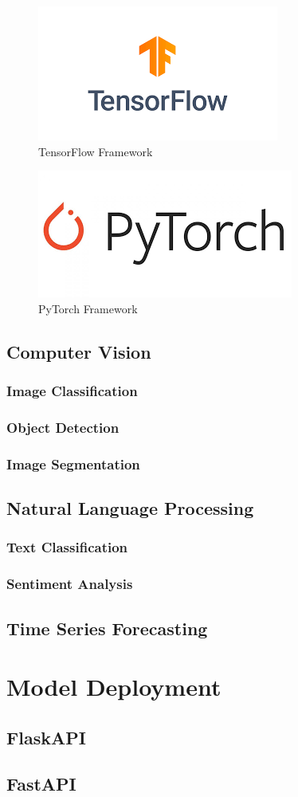 \documentclass[12pt, a4paper]{report}
\begin{document}
\begin{figure}[h!]
    \centering
    \includegraphics[]{figs/tensorflow.png}
    \caption{TensorFlow Framework}
\end{figure}

\begin{figure}[h!]
    \centering\includegraphics[]{figs/pytorch.png}
    \caption{PyTorch Framework}
\end{figure}

\subsection{Computer Vision}
\subsubsection{Image Classification}
\subsubsection{Object Detection}
\subsubsection{Image Segmentation}
\subsection{Natural Language Processing}
\subsubsection{Text Classification}
\subsubsection{Sentiment Analysis}
\subsection{Time Series Forecasting}

\section{Model Deployment}
\subsection{FlaskAPI}
\subsection{FastAPI}
\end{document}
